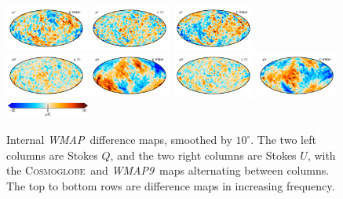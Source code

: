 \documentclass[twocolumn]{../../common/aa}
\def\WMAP{\emph{WMAP}}
\def\WMAPnine{\emph{WMAP9}}
\newcommand{\cosmoglobe}{\textsc{Cosmoglobe}}
\begin{document}
\begin{figure}
	\includegraphics[width=0.24\textwidth]{figures/V_W_deltaQ.pdf}
	\includegraphics[width=0.24\textwidth]{figures/V_deltaU.pdf}
	\includegraphics[width=0.24\textwidth]{figures/V_W_deltaU.pdf}\\
	\includegraphics[width=0.24\textwidth]{figures/W_deltaQ.pdf}
	\includegraphics[width=0.24\textwidth]{figures/W_W_deltaQ.pdf}
	\includegraphics[width=0.24\textwidth]{figures/W_deltaU.pdf}
	\includegraphics[width=0.24\textwidth]{figures/W_W_deltaU.pdf}
        \includegraphics[width=0.25\textwidth]{figures/cbar_10uK.pdf}
	\caption{Internal \WMAP\ difference maps, smoothed by $10^\circ$. The two left columns are Stokes $Q$, and the two right columns are Stokes $U$, with the \cosmoglobe\ and \WMAPnine\ maps alternating between columns. The top to bottom rows are difference maps in increasing frequency.}
	\label{fig:internal_diff}
\end{figure}
\end{document}
